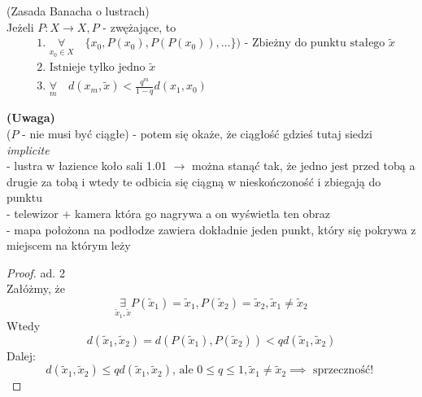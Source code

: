 \documentclass[../main.tex]{subfiles}
\begin{document}
\begin{tw}
    (Zasada Banacha o lustrach)\\
    Jeżeli $P: X \to X, P$ - zwężające, to
    \begin{align}\label{eq:banach}
        &\text{1. } \underset{x_0 \in X}{\forall}\quad \{x_0,P(x_0),P(P(x_0)),\dots\}) \text{ - Zbieżny do punktu stałego } \tilde x\\
        &\text{2. Istnieje tylko jedno }\tilde x\\
        &\text{3. } \underset{m}{\forall}\quad d(x_m,\tilde x) < \frac{q^m}{1-q} d(x_1, x_0)
    \end{align}
\end{tw}


\begin{przyklad}
    \textbf{(Uwaga)}\\
($P$ - nie musi być ciągłe) - potem się okaże, że ciągłość gdzieś tutaj siedzi \textit{implicite}\\
\noindent- lustra w łazience koło sali 1.01 $\rightarrow$ można stanąć tak, że jedno jest przed tobą a drugie za tobą i wtedy te odbicia się ciągną w nieskończoność i zbiegają do punktu\\
- telewizor + kamera która go nagrywa a on wyświetla ten obraz\\
- mapa położona na podłodze zawiera dokładnie jeden punkt, który się pokrywa z miejscem na którym leży
\end{przyklad}
\begin{proof}
ad. 2\\
Załóżmy, że
    \[
        \underset{\tilde x_1, \tilde x}{\exists} P(\tilde x_1) = \tilde x_1, P(\tilde x_2) = \tilde x_2, \tilde x_1 \neq \tilde x_2
    \]
Wtedy
    \[
        d(\tilde x_1, \tilde x_2) = d(P(\tilde x_1),P(\tilde x_2)) < qd(\tilde x_1, \tilde x_2)
    \]
Dalej:
    \[
        d(\tilde x_1, \tilde x_2) \leq q d(\tilde x_1, \tilde x_2)\text{, ale }0\leq q \leq 1,\tilde x_1 \neq \tilde x_2 \implies \text{ sprzeczność! }
    \]
\end{proof}
\end{document}

